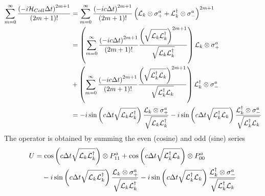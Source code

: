 \documentclass[a4paper,12pt]{article}
\begin{document}
\begin{align}
	\sum_{m=0}^{\infty}{ \frac{\left( -i \mathcal{H}_{Coll} \Delta t \right)^{2m+1}}{(2m+1)!} } &= \sum_{m=0}^{\infty}{ \frac{\left( -i c \Delta t \right)^{2m+1}}{(2m+1)!} \left( \mathcal{L}_{k} \otimes \sigma_{+}^{a} + \mathcal{L}_{k}^{\dagger} \otimes \sigma_{-}^{a} \right)^{2m+1}} \notag \\
	&= \left(\sum_{m=0}^{\infty}{\frac{\left( -i c \Delta t \right)^{2m+1}}{(2m+1)!} \frac{\left( \sqrt{\mathcal{L}_{k} \mathcal{L}_{k}^{\dagger} }\right)^{2m+1}}{\sqrt{\mathcal{L}_{k} \mathcal{L}_{k}^{\dagger} }}} \right) \mathcal{L}_{k} \otimes \sigma_{+}^{a} \notag \\
	&+ \left(\sum_{m=0}^{\infty}{\frac{\left( -i c \Delta t \right)^{2m+1}}{(2m+1)!} \frac{\left( \sqrt{\mathcal{L}_{k}^{\dagger} \mathcal{L}_{k} }\right)^{2m+1}}{\sqrt{\mathcal{L}_{k}^{\dagger} \mathcal{L}_{k} }}} \right) \mathcal{L}_{k}^{\dagger} \otimes \sigma_{-}^{a} \notag \\
	&= -i \sin \left( c \Delta t \sqrt{\mathcal{L}_{k} \mathcal{L}_{k}^{\dagger}} \right) \frac{\mathcal{L}_{k} \otimes \sigma_{+}^{a}}{\sqrt{\mathcal{L}_{k} \mathcal{L}_{k}^{\dagger}}} -i \sin \left( c \Delta t \sqrt{\mathcal{L}_{k}^{\dagger} \mathcal{L}_{k}} \right) \frac{\mathcal{L}_{k}^{\dagger} \otimes \sigma_{-}^{a}}{\sqrt{\mathcal{L}_{k}^{\dagger} \mathcal{L}_{k}}} 
\end{align}
The operator is obtained by summing the even (cosine) and odd (sine) series
\begin{align}
	U &= \cos{\left(c \Delta t \sqrt{\mathcal{L}_{k} \mathcal{L}_{k}^{\dagger} }\right) } \otimes P_{11}^{a} + \cos{\left(c \Delta t \sqrt{\mathcal{L}_{k}^{\dagger} \mathcal{L}_{k} } \right) } \otimes P_{00}^{a} \notag \\
	&\quad -i \sin \left( c \Delta t \sqrt{\mathcal{L}_{k} \mathcal{L}_{k}^{\dagger}} \right) \frac{\mathcal{L}_{k} \otimes \sigma_{+}^{a}}{\sqrt{\mathcal{L}_{k} \mathcal{L}_{k}^{\dagger}}} -i \sin \left( c \Delta t \sqrt{\mathcal{L}_{k}^{\dagger} \mathcal{L}_{k}} \right) \frac{\mathcal{L}_{k}^{\dagger} \otimes \sigma_{-}^{a}}{\sqrt{\mathcal{L}_{k}^{\dagger} \mathcal{L}_{k}}}
\end{align}
\end{document}
